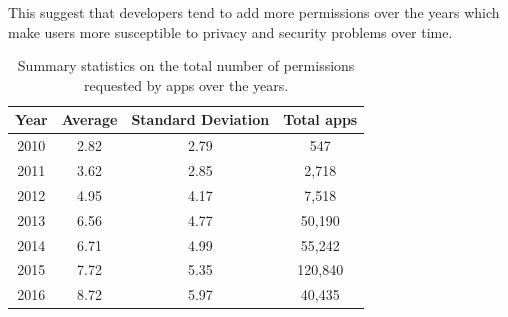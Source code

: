 This suggest that developers tend to add more permissions over the years which make users more susceptible to privacy and security problems over time.
\begin{table}[t]
	\def\arraystretch{2}
	\centering
	\begin{tabular}{ |c|c|c|c| }
		\hline
		Year & Average & Standard Deviation & Total apps \\ \hline
		2010 & 2.82 & 2.79 & 547 \\  \hline
		2011 & 3.62 & 2.85 & 2,718 \\ \hline
		2012 & 4.95 & 4.17 & 7,518 \\ \hline
		2013 & 6.56 & 4.77 & 50,190 \\ \hline
		2014 & 6.71 & 4.99 & 55,242 \\ \hline
		2015 & 7.72 & 5.35 & 120,840 \\ \hline
		2016 & 8.72 & 5.97 & 40,435 \\
		\hline
	\end{tabular}
	\caption{Summary statistics on the total number of permissions requested by apps over the years.}
	\label{tab:average_permissions_years}
\end{table}
